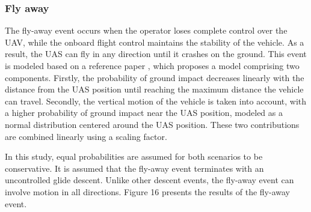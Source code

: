 \documentclass[12pt]{report}
\begin{document}
        \subsubsection{Fly away}
        The fly-away event occurs when the operator loses complete control over the UAV, while the onboard flight
        control maintains the stability of the vehicle. As a result, the UAS can fly in any direction until it crashes
        on the ground. This event is modeled based on a reference paper \cite{la_cour-harbo_quantifying_2019} , which
        proposes a model comprising two components. Firstly, the probability of ground impact decreases linearly with
        the distance from the UAS position until reaching the maximum distance the vehicle can travel. Secondly, the
        vertical motion of the vehicle is taken into account, with a higher probability of ground impact near the UAS
        position, modeled as a normal distribution centered around the UAS position. These two contributions are
        combined linearly using a scaling factor.
            
        In this study, equal probabilities are assumed for both scenarios to be conservative. It is assumed that the
        fly-away event terminates with an uncontrolled glide descent. Unlike other descent events, the fly-away event
        can involve motion in all directions. Figure 16 presents the results of the fly-away event.
\end{document}
